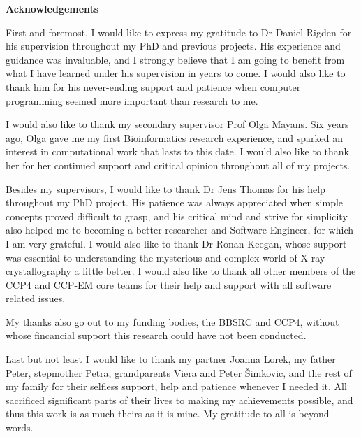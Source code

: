 \begin{center}
    \LARGE
    \textbf{Acknowledgements}
    \vspace{0.5cm}
\end{center}

First and foremost, I would like to express my gratitude to Dr Daniel Rigden for his supervision throughout my PhD and previous projects. His experience and guidance was invaluable, and I strongly believe that I am going to benefit from what I have learned under his supervision in years to come. I would also like to thank him for his never-ending support and patience when computer programming seemed more important than research to me.

I would also like to thank my secondary supervisor Prof Olga Mayans. Six years ago, Olga gave me my first Bioinformatics research experience, and sparked an interest in computational work that lasts to this date. I would also like to thank her for her continued support and critical opinion throughout all of my projects.

Besides my supervisors, I would like to thank Dr Jens Thomas for his help throughout my PhD project. His patience was always appreciated when simple concepts proved difficult to grasp, and his critical mind and strive for simplicity also helped me to becoming a better researcher and Software Engineer, for which I am very grateful. I would also like to thank Dr Ronan Keegan, whose support was essential to understanding the mysterious and complex world of X-ray crystallography a little better. I would also like to thank all other members of the CCP4 and CCP-EM core teams for their help and support with all software related issues.

My thanks also go out to my funding bodies, the BBSRC and CCP4, without whose fincancial support this research could have not been conducted.

Last but not least I would like to thank my partner Joanna Lorek, my father Peter, stepmother Petra, grandparents Viera and Peter \v{S}imkovic, and the rest of my family for their selfless support, help and patience whenever I needed it. All sacrificed significant parts of their lives to making my achievements possible, and thus this work is as much theirs as it is mine. My gratitude to all is beyond words.
